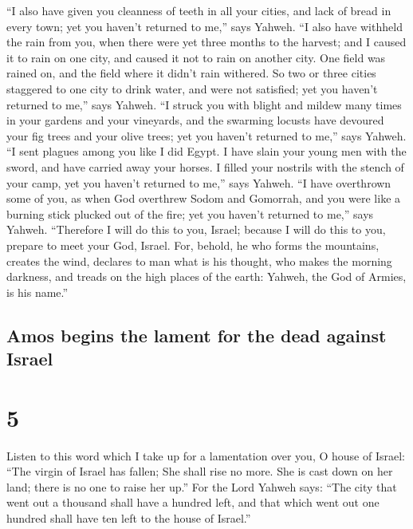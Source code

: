  ``I also have given you cleanness of teeth in all your
cities, and lack of bread in every town; yet you haven't returned to
me,'' says Yahweh.  ``I also have withheld the rain from
you, when there were yet three months to the harvest; and I caused it to
rain on one city, and caused it not to rain on another city. One field
was rained on, and the field where it didn't rain withered.
 So two or three cities staggered to one city to drink
water, and were not satisfied; yet you haven't returned to me,'' says
Yahweh.  ``I struck you with blight and mildew many times
in your gardens and your vineyards, and the swarming locusts have
devoured your fig trees and your olive trees; yet you haven't returned
to me,'' says Yahweh.  ``I sent plagues among you like I
did Egypt. I have slain your young men with the sword, and have carried
away your horses. I filled your nostrils with the stench of your camp,
yet you haven't returned to me,'' says Yahweh.  ``I have
overthrown some of you, as when God overthrew Sodom and Gomorrah, and
you were like a burning stick plucked out of the fire; yet you haven't
returned to me,'' says Yahweh.  ``Therefore I will do
this to you, Israel; because I will do this to you, prepare to meet your
God, Israel.  For, behold, he who forms the mountains,
creates the wind, declares to man what is his thought, who makes the
morning darkness, and treads on the high places of the earth: Yahweh,
the God of Armies, is his name.''

\hypertarget{amos-begins-the-lament-for-the-dead-against-israel}{%
\subsection{Amos begins the lament for the dead against
Israel}\label{amos-begins-the-lament-for-the-dead-against-israel}}

\hypertarget{section-4}{%
\section{5}\label{section-4}}

 Listen to this word which I take up for a lamentation
over you, O house of Israel:  ``The virgin of Israel has
fallen; She shall rise no more. She is cast down on her land; there is
no one to raise her up.''  For the Lord Yahweh says: ``The
city that went out a thousand shall have a hundred left, and that which
went out one hundred shall have ten left to the house of Israel.''


